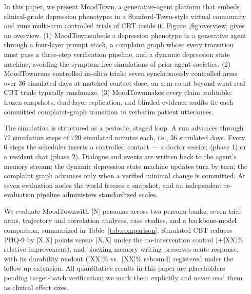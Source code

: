\documentclass[10pt]{article}
\newcommand{\sys}{MoodTown}
\begin{document}
In this paper, we present \sys, a generative-agent platform that embeds clinical-grade depression phenotypes in a Stanford-Town-style virtual community and runs multi-arm controlled trials of CBT inside it.
Figure~\ref{fig:overview} gives an overview.
(1) \sys embeds a depression phenotype in a generative agent through a four-layer prompt stack, a complaint graph whose every transition must pass a three-step verification pipeline, and a dynamic depression state machine, avoiding the symptom-free simulations of prior agent societies.
(2) \sys runs controlled in-silico trials: seven synchronously controlled arms over 36 simulated days at matched contact dose, an arm count beyond what real CBT trials typically randomize.
(3) \sys makes every claim auditable: frozen snapshots, dual-layer replication, and blinded evidence audits tie each committed complaint-graph transition to verbatim patient utterances.

The simulation is structured as a periodic, staged loop.
A run advances through 72 simulation steps of 720 simulated minutes each, i.e., 36 simulated days.
Every 6 steps the scheduler inserts a controlled contact --- a doctor session (phase 1) or a resident chat (phase 2).
Dialogue and events are written back to the agent's memory stream; the dynamic depression state machine updates turn by turn; the complaint graph advances only when a verified minimal change is committed.
At seven evaluation nodes the world freezes a snapshot, and an independent re-evaluation pipeline administers standardized scales.

We evaluate \sys with [N] personas across two persona banks, seven trial arms, trajectory and correlation analyses, case studies, and a backbone-model comparison, summarized in Table~\ref{tab:comparison}.
Simulated CBT reduces PHQ-9 by [X.X] points versus [X.X] under the no-intervention control (+[XX]\% relative improvement), and blocking memory writing preserves acute response, with its durability readout ([XX]\% vs.\ [XX]\% rebound) registered under the follow-up extension.
All quantitative results in this paper are placeholders pending target-batch verification; we mark them explicitly and never read them as clinical effect sizes.
\end{document}

